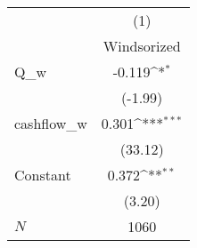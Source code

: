 {
\def\sym#1{\ifmmode^{#1}\else\(^{#1}\)\fi}
\begin{tabular}{l*{1}{c}}
\hline\hline
            &\multicolumn{1}{c}{(1)}         \\
            & Windsorized         \\
\hline
Q\_w         &      -0.119\sym{*}  \\
            &     (-1.99)         \\
cashflow\_w  &       0.301\sym{***}\\
            &     (33.12)         \\
Constant    &       0.372\sym{**} \\
            &      (3.20)         \\
\hline
\(N\)       &        1060         \\
\hline\hline
\end{tabular}
}
